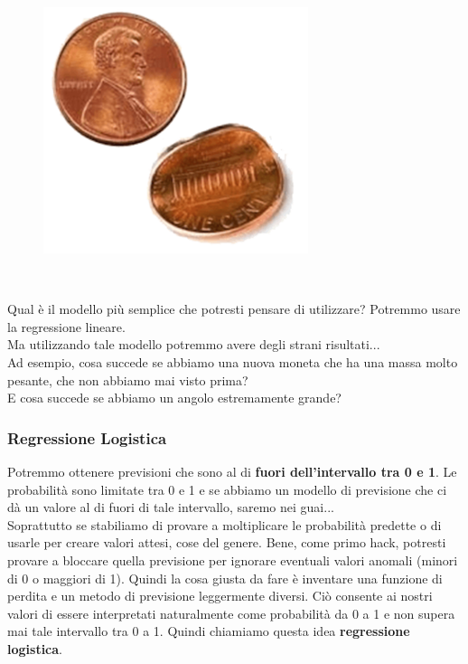 \begin{frame}
\begin{columns}
		\begin{figure}[!htbp]
			\centering
			\includegraphics[width=1.0\linewidth]{images/supervised/z_algoritms_logistic_regression/flipped_coin.png}
		\end{figure}			
	\end{columns}
	\ \\
	Qual è il modello più semplice che potresti pensare di utilizzare?
	\newlinedouble
	Potremmo usare la regressione lineare.\\
	Ma utilizzando tale modello potremmo avere degli strani risultati...\\
	Ad esempio, cosa succede se abbiamo una nuova moneta che ha una massa molto pesante, che non abbiamo mai visto prima?\\
	E cosa succede se abbiamo un angolo estremamente grande?
\end{frame}


\begin{frame}
	
	\frametitle{Regressione Logistica}
	
	Potremmo ottenere previsioni che sono al di \textbf{fuori dell'intervallo tra 0 e 1}.
	\newlinedouble
	Le probabilità sono limitate tra 0 e 1 e se abbiamo un modello di previsione che ci dà un valore al di fuori di tale intervallo, saremo nei guai...\\
	Soprattutto se stabiliamo di provare a moltiplicare le probabilità predette o di usarle per creare valori attesi, cose del genere.
	\newlinedouble
	Bene, come primo hack, potresti provare a bloccare quella previsione per ignorare eventuali valori anomali (minori di 0 o maggiori di 1).
	\newlinedouble
	Quindi la cosa giusta da fare è inventare una funzione di perdita e un metodo di previsione leggermente diversi.
	Ciò consente ai nostri valori di essere interpretati naturalmente come probabilità da 0 a 1 e non supera mai tale intervallo tra 0 a 1.
	Quindi chiamiamo questa idea \textbf{regressione logistica}.
\end{frame}


